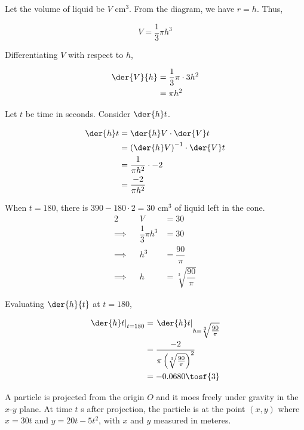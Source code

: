 \documentclass{jhwhw}
\begin{document}
        Let the volume of liquid be $V$ cm$^3$. From the diagram, we have $r = h$. Thus,

        \begin{equation*}
            V = \dfrac13 \pi h^3
        \end{equation*}

        Differentiating $V$ with respect to $h$,

        \begin{align*}
            \der{V}{h}&= \dfrac13 \pi \cdot 3 h^2\\
            &= \pi h^2
        \end{align*}

        Let $t$ be time in seconds. Consider $\der{h}t$.

        \begin{align*}
            \der{h}t &= \der{h}V \cdot \der{V}t\\
            &= \left(\der{h}V\right)^{-1} \cdot \der{V}t\\
            &= \dfrac1{\pi h^2} \cdot -2\\
            &= \dfrac{-2}{\pi h^2}
        \end{align*}

        When $t = 180$, there is $390 - 180\cdot2 = 30$ cm$^3$ of liquid left in the cone.
        \begin{alignat*}{2}
            &&V &= 30\\
            \implies&&\dfrac13 \pi h^3 &= 30\\
            \implies&&h^3 &= \dfrac{90}{\pi}\\
            \implies&&h &= \sqrt[3]{\dfrac{90}{\pi}}
        \end{alignat*}

        Evaluating $\der{h}{t}$ at $t =180$,

        \begin{align*}
            \left.\der{h}t\right|_{t = 180} &= \left.\der{h}t\right|_{h = \sqrt[3]{\tfrac{90}{\pi}}}\\
            &= \dfrac{-2}{\pi \left(\sqrt[3]{\tfrac{90}{\pi}}\right)^2}\\
            &= -0.0680 \tosf{3}
        \end{align*}



    \problem{}
        A particle is projected from the origin $O$ and it moes freely under gravity in the $x$-$y$ plane. At time $t$ s after projection, the particle is at the point $(x,y)$ where $x=30t$ and $y=20t-5t^2$, with $x$ and $y$ measured in meteres.
\end{document}
